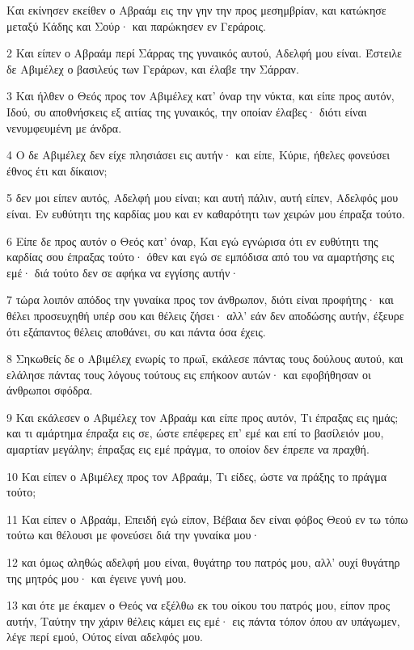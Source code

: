 \par Και εκίνησεν εκείθεν ο Αβραάμ εις την γην την προς μεσημβρίαν, και κατώκησε μεταξύ Κάδης και Σούρ· και παρώκησεν εν Γεράροις.
\par 2 Και είπεν ο Αβραάμ περί Σάρρας της γυναικός αυτού, Αδελφή μου είναι. Έστειλε δε Αβιμέλεχ ο βασιλεύς των Γεράρων, και έλαβε την Σάρραν.
\par 3 Και ήλθεν ο Θεός προς τον Αβιμέλεχ κατ' όναρ την νύκτα, και είπε προς αυτόν, Ιδού, συ αποθνήσκεις εξ αιτίας της γυναικός, την οποίαν έλαβες· διότι είναι νενυμφευμένη με άνδρα.
\par 4 Ο δε Αβιμέλεχ δεν είχε πλησιάσει εις αυτήν· και είπε, Κύριε, ήθελες φονεύσει έθνος έτι και δίκαιον;
\par 5 δεν μοι είπεν αυτός, Αδελφή μου είναι; και αυτή πάλιν, αυτή είπεν, Αδελφός μου είναι. Εν ευθύτητι της καρδίας μου και εν καθαρότητι των χειρών μου έπραξα τούτο.
\par 6 Είπε δε προς αυτόν ο Θεός κατ' όναρ, Και εγώ εγνώρισα ότι εν ευθύτητι της καρδίας σου έπραξας τούτο· όθεν και εγώ σε εμπόδισα από του να αμαρτήσης εις εμέ· διά τούτο δεν σε αφήκα να εγγίσης αυτήν·
\par 7 τώρα λοιπόν απόδος την γυναίκα προς τον άνθρωπον, διότι είναι προφήτης· και θέλει προσευχηθή υπέρ σου και θέλεις ζήσει· αλλ' εάν δεν αποδώσης αυτήν, έξευρε ότι εξάπαντος θέλεις αποθάνει, συ και πάντα όσα έχεις.
\par 8 Σηκωθείς δε ο Αβιμέλεχ ενωρίς το πρωΐ, εκάλεσε πάντας τους δούλους αυτού, και ελάλησε πάντας τους λόγους τούτους εις επήκοον αυτών· και εφοβήθησαν οι άνθρωποι σφόδρα.
\par 9 Και εκάλεσεν ο Αβιμέλεχ τον Αβραάμ και είπε προς αυτόν, Τι έπραξας εις ημάς; και τι αμάρτημα έπραξα εις σε, ώστε επέφερες επ' εμέ και επί το βασίλειόν μου, αμαρτίαν μεγάλην; έπραξας εις εμέ πράγμα, το οποίον δεν έπρεπε να πραχθή.
\par 10 Και είπεν ο Αβιμέλεχ προς τον Αβραάμ, Τι είδες, ώστε να πράξης το πράγμα τούτο;
\par 11 Και είπεν ο Αβραάμ, Επειδή εγώ είπον, Βέβαια δεν είναι φόβος Θεού εν τω τόπω τούτω και θέλουσι με φονεύσει διά την γυναίκα μου·
\par 12 και όμως αληθώς αδελφή μου είναι, θυγάτηρ του πατρός μου, αλλ' ουχί θυγάτηρ της μητρός μου· και έγεινε γυνή μου.
\par 13 και ότε με έκαμεν ο Θεός να εξέλθω εκ του οίκου του πατρός μου, είπον προς αυτήν, Ταύτην την χάριν θέλεις κάμει εις εμέ· εις πάντα τόπον όπου αν υπάγωμεν, λέγε περί εμού, Ούτος είναι αδελφός μου.
